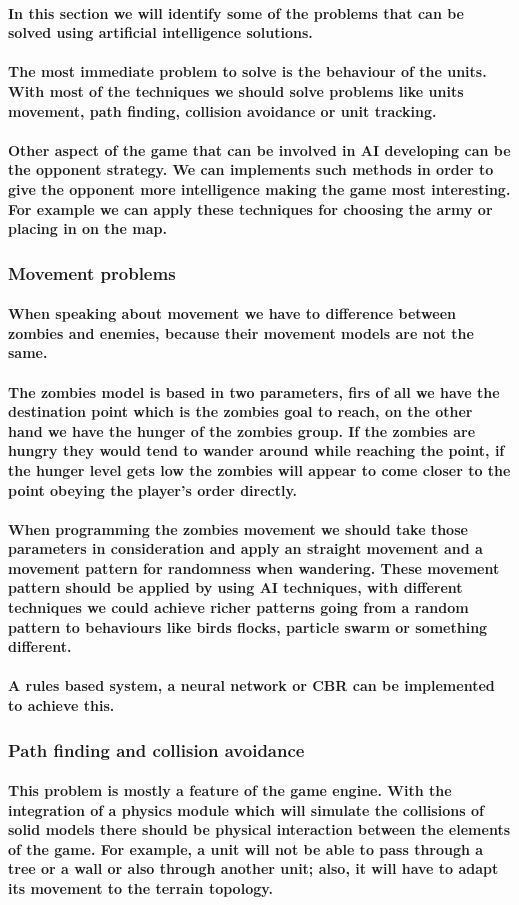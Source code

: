\documentclass[a4paper,10pt]{article}
\newcommand{\p}[1]{\paragraph{\indent\textnormal{#1}}}
\begin{document}
  \p{In this section we will identify some of the problems that can be solved using artificial intelligence solutions.}

  \p{The most immediate problem to solve is the behaviour of the units. With most of the techniques we should solve problems like units movement, path finding, collision avoidance or unit tracking.}

  \p{Other aspect of the game that can be involved in AI developing can be the opponent strategy. We can implements such methods in order to give the opponent more intelligence making the game most interesting. For example we can apply these techniques for choosing the army or placing in on the map.}

  \subsubsection{Movement problems}
    
    \p{When speaking about movement we have to difference between zombies and enemies, because their movement models are not the same.}

    \p{The zombies model is based in two parameters, firs of all we have the destination point which is the zombies goal to reach, on the other hand we have the hunger of the zombies group. If the zombies are hungry they would tend to wander around while reaching the point, if the hunger level gets low the zombies will appear to come closer to the point obeying the player's order directly.}

    \p{When programming the zombies movement we should take those parameters in consideration and apply an straight movement and a movement pattern for randomness when wandering. These movement pattern should be applied by using AI techniques, with different techniques we could achieve richer patterns going from a random pattern to behaviours like birds flocks, particle swarm or something different.}

    \p{A rules based system, a neural network or CBR can be implemented to achieve this.}

   \subsubsection{Path finding and collision avoidance}

    \p{This problem is mostly a feature of the game engine. With the integration of a physics module which will simulate the collisions of solid models there should be physical interaction between the elements of the game. For example, a unit will not be able to pass through a tree or a wall or also through another unit; also, it will have to adapt its movement to the terrain topology.}
\end{document}
